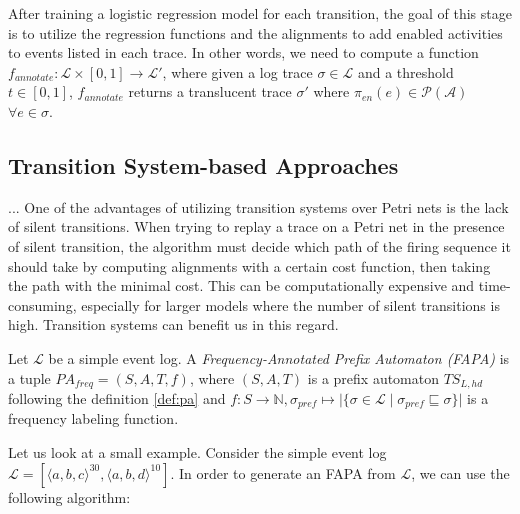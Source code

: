 After training a logistic regression model for each transition, the goal of this stage is to utilize the regression functions and the alignments to add enabled activities to events listed in each trace. In other words, we need to compute a function $f_{annotate}: \mathcal{L} \times [0, 1] \rightarrow \mathcal{L'}$, where given a log trace $\sigma \in \mathcal{L}$ and a threshold $t \in [0, 1]$, $f_{annotate}$ returns a translucent trace $\sigma'$ where $\pi_{en}(e) \in \mathcal{P(\mathcal{A})}$ $\forall e \in \sigma$.

\subsection{Transition System-based Approaches}

... One of the advantages of utilizing transition systems over Petri nets is the lack of silent transitions. When trying to replay a trace on a Petri net in the presence of silent transition, the algorithm must decide which path of the firing sequence it should take by computing alignments with a certain cost function, then taking the path with the minimal cost. This can be computationally expensive and time-consuming, especially for larger models where the number of silent transitions is high. Transition systems can benefit us in this regard.

\begin{definition}
    Let $\mathcal{L}$ be a simple event log. A \emph{Frequency-Annotated Prefix Automaton (FAPA)} is a tuple $PA_{freq} = (S, A, T, f)$, where $(S, A, T)$ is a prefix automaton $TS_{L, hd}$ following the definition \ref{def:pa} and  $f: S \to \mathbb{N}, \sigma_{pref} \mapsto \lvert \{ \sigma \in \mathcal{L} \mid \sigma_{pref} \sqsubseteq \sigma \}\rvert$ is a frequency labeling function.
\end{definition}

Let us look at a small example. Consider the simple event log $\mathcal{L} = [\langle a, b, c \rangle^{30}, \langle a, b, d \rangle^{10}]$. In order to generate an FAPA from $\mathcal{L}$, we can use the following algorithm:


